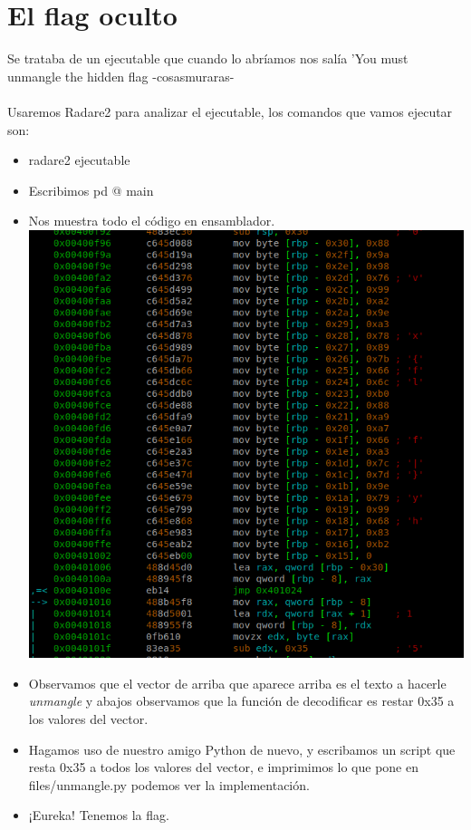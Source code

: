 \documentclass[11pt, spanish]{report}
\begin{document}
\section*{El flag oculto}
Se trataba de un ejecutable que cuando lo abríamos nos salía 'You must unmangle the hidden flag -cosasmuraras- \\ \\
Usaremos Radare2 para analizar el ejecutable, los comandos que vamos ejecutar son:
\begin{itemize}
	\item radare2 ejecutable
	\item Escribimos pd @ main
	\item Nos muestra todo el código en ensamblador. \\
	\includegraphics[width=\textwidth]{radare}
	\item Observamos que el vector de arriba que aparece arriba es el texto a hacerle \textit{unmangle} y abajos observamos que la función de decodificar es restar 0x35 a los valores del vector.
	\item Hagamos uso de nuestro amigo Python de nuevo, y escribamos un script que resta 0x35 a todos los valores del vector, e imprimimos lo que pone en files/unmangle.py podemos ver la implementación.
	\item ¡Eureka! Tenemos la flag.
\end{itemize}
\end{document}
